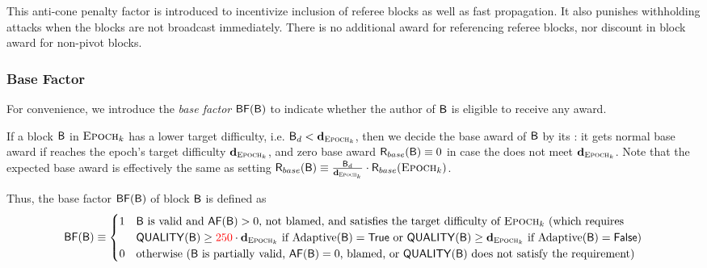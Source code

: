 This anti-cone penalty factor is introduced to incentivize inclusion of {referee} blocks as well as fast propagation.
It also punishes withholding attacks when the blocks are not broadcast immediately. 
There is no additional award for referencing {referee} blocks, nor discount in block award for  non-pivot blocks.


\subsubsection{Base Factor}
\label{sec:discount}

For convenience, we introduce the \emph{base factor} $\mathsf{BF}(\textsf{B})$ to indicate whether the author of $\textsf{B}$ is eligible to receive any award.

If a block $\textsf{B}$ in $\textsc{Epoch}_k$ has a lower target difficulty, i.e. $\textsf{B}_d<\mathbf{d}_{\textsc{Epoch}_k}$,
then we decide the base award of $\textsf{B}$ by its 
:
it gets normal base award if 
reaches the epoch's target difficulty $\mathbf{d}_{\textsc{Epoch}_k}$, and zero base award $\textsf{R}_{base}(\textsf{B})\equiv 0$ in case the 
 does not meet $\mathbf{d}_{\textsc{Epoch}_k}$.
Note that the expected base award is effectively the same as setting $\textsf{R}_{base}(\textsf{B})\equiv\frac{\textsf{B}_d}{\mathbf{d}_{\textsc{Epoch}_k}} \cdot \textsf{R}_{base}(\textsc{Epoch}_k)$.


Thus, the base factor $\mathsf{BF}(\textsf{B})$ of block $\textsf{B}$ is defined as
\begin{align}\label{eq:basef}
	\mathsf{BF}(\textsf{B})\equiv \begin{cases}
		1 & \mbox{$\textsf{B}$ is valid and $\mathsf{AF}(\textsf{B})>0$, {not blamed, and satisfies the target difficulty of $\textsc{Epoch}_k$ (which requires  }}\\
		~ & \mbox{{$\mathsf{QUALITY}(\textsf{B})\ge {\color{red}250} \cdot \mathbf{d}_{\textsc{Epoch}_k}$ if $\mathrm{Adaptive}(\textsf{B})=\mathsf{True}$ or $\mathsf{QUALITY}(\textsf{B})\ge \mathbf{d}_{\textsc{Epoch}_k}$ if $\mathrm{Adaptive}(\textsf{B})=\mathsf{False}$)}}\\
		0 & \mbox{otherwise ($\textsf{B}$ is partially valid, {$\mathsf{AF}(\textsf{B})=0$, blamed}, or $\mathsf{QUALITY}(\textsf{B})$ does not satisfy the requirement)} 
	\end{cases}
\end{align}

